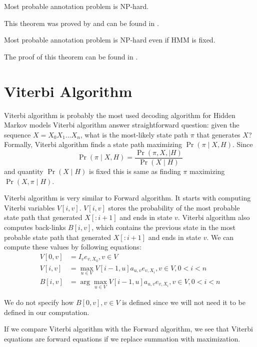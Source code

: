 \begin{theorem}
Most probable annotation problem is NP-hard.
\end{theorem}
This theorem was proved by \cite{} and can be found in \cite{}.

\begin{theorem}
Most probable annotation problem is NP-hard even if HMM is fixed.
\end{theorem}
The proof of this theorem can be found in \cite{}.


\section{Viterbi Algorithm}
Viterbi algorithm is probably the most used decoding algorithm for Hidden Markov
models
Viterbi algorithm answer straightforward question: given the sequence
$X=X_0X_1\dots X_n$, what
is the most-likely state path $\pi$ that generates $X$? Formally, Viterbi
algorithm finds a state path maximizing $\Pr\left( \pi\mid X,H \right)$. Since
\[\Pr\left(\pi\mid X,H\right) = \frac{\Pr\left(\pi,X,\mid
H\right)}{\Pr\left(X\mid H\right)}\] and quantity $\Pr\left(X\mid H\right)$ is fixed
this is same as finding $\pi$ maximizing $\Pr\left(X,\pi\mid H\right)$. 

Viterbi algorithm is very similar to Forward algorithm. It starts with computing
Viterbi variables $V[i,v]$. $V[i,v]$ stores the probability of the most probable 
state path that generated $X[:i+1]$ and ends in state $v$. Viterbi algorithm
also computes back-links $B[i,v]$, which contains the previous state in the most
probable state path that generated $X[:i+1]$ and ends in state $v$. We can
compute these values by following equations:
\begin{align}
V[0,v] &= I_{v}e_{v,X_0}, v\in V\\
V[i,v] &= \max_{u\in V} V[i-1,u]a_{u,v}e_{v,X_i}, v\in V,0<i<n\\
B[i,v] &= \arg\max_{u\in V} V[i-1,u]a_{u,v}e_{v,X_i}, v\in V,0<i<n
\end{align}
\begin{note}
We do not specify how $B[0,v],v\in V$ is defined since we will not
need it to be defined in our computation.
\end{note}
\begin{note}
If we compare Viterbi algorithm with the Forward algorithm, we see that
Viterbi equations are forward equations if we replace summation with
maximization.
\end{note}

